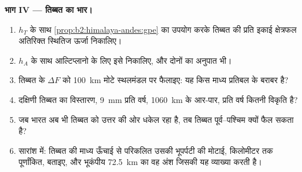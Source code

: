 \begin{problem}[{सप्ताहांत समस्या --- दो पठार}]
\noindent\textbf{भाग IV --- तिब्बत का भार।}
\begin{enumerate}[resume]
\item $h_T$ के साथ \cref{prop:b2:himalaya-andes:gpe} का उपयोग करके तिब्बत की प्रति इकाई क्षेत्रफल अतिरिक्त स्थितिज
ऊर्जा निकालिए।
\item $h_A$ के साथ आल्टिप्लानो के लिए इसे निकालिए, और दोनों का अनुपात भी।
\item तिब्बत के $\Delta F$ को \qty{100}{km} मोटे स्थलमंडल पर फैलाइए: यह किस माध्य प्रतिबल
के बराबर है?
\item दक्षिणी तिब्बत का विस्तारण, \qty{9}{mm} प्रति वर्ष, \qty{1060}{km} के आर-पार, प्रति वर्ष कितनी
विकृति है?
\item जब भारत अब भी तिब्बत को उत्तर की ओर धकेल रहा है, तब तिब्बत पूर्व--पश्चिम क्यों फैल सकता है?
\item सारांश में: तिब्बत की माध्य ऊँचाई से परिकलित उसकी भूपर्पटी की मोटाई, किलोमीटर तक
पूर्णांकित, बताइए, और भूकंपीय \qty{72.5}{km} का वह अंश जिसकी यह व्याख्या करती है।
\end{enumerate}
\end{problem}
